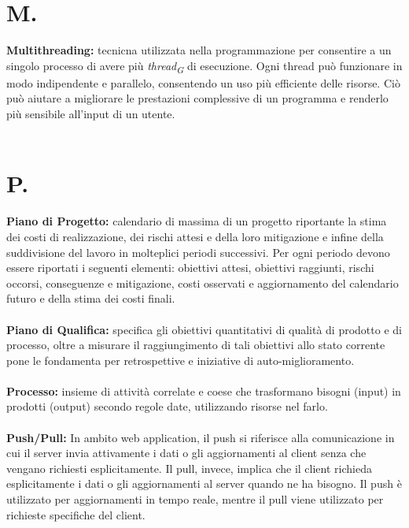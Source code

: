 \documentclass[a4paper, 12pt]{article}
\begin{document}
\newpage
\section{M.}
\textbf{Multithreading:} tecnicna utilizzata nella programmazione per consentire a un singolo processo di avere più \textit{thread\textsubscript{G}} di esecuzione. Ogni thread può funzionare in modo indipendente e parallelo, consentendo un uso più efficiente delle risorse. Ciò può aiutare a migliorare le prestazioni complessive di un programma e renderlo più sensibile all'input di un utente. \\ \\

\newpage
\section{P.}
\textbf{Piano di Progetto:} calendario di massima di un progetto riportante la stima dei costi di realizzazione, dei rischi attesi e della loro mitigazione e infine della suddivisione del lavoro in molteplici periodi successivi. Per ogni periodo devono essere riportati i seguenti elementi: obiettivi attesi, obiettivi raggiunti, rischi occorsi, conseguenze e mitigazione, costi osservati e aggiornamento del calendario futuro e della stima dei costi finali. \\ \\
\textbf{Piano di Qualifica:} specifica gli obiettivi quantitativi di qualità di prodotto e di processo, oltre a misurare il raggiungimento di tali obiettivi allo stato corrente pone le fondamenta per retrospettive e iniziative di auto-miglioramento. \\ \\
\textbf{Processo:} insieme di attività correlate e coese che trasformano bisogni (input) in prodotti (output) secondo regole date, utilizzando risorse nel farlo. \\ \\
\textbf{Push/Pull:} In ambito web application, il push si riferisce alla comunicazione in cui il server invia attivamente i dati o gli aggiornamenti al client senza che vengano richiesti esplicitamente. Il pull, invece, implica che il client richieda esplicitamente i dati o gli aggiornamenti al server quando ne ha bisogno. Il push è utilizzato per aggiornamenti in tempo reale, mentre il pull viene utilizzato per richieste specifiche del client. \\ \\

\newpage
\end{document}

